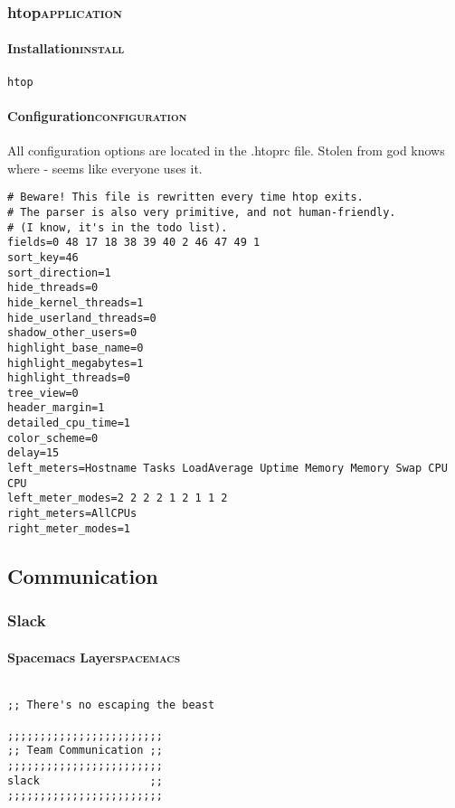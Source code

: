 \documentclass[11pt]{article}
\begin{document}
\subsubsection{htop\hfill{}\textsc{application}}
\label{sec:org262f1df}
\paragraph{Installation\hfill{}\textsc{install}}
\label{sec:orgaa9491f}
\begin{verbatim}
htop
\end{verbatim}

\paragraph{Configuration\hfill{}\textsc{configuration}}
\label{sec:orgb64764a}
All configuration options are located in the .htoprc file.
Stolen from god knows where - seems like everyone uses it.

\begin{verbatim}
# Beware! This file is rewritten every time htop exits.
# The parser is also very primitive, and not human-friendly.
# (I know, it's in the todo list).
fields=0 48 17 18 38 39 40 2 46 47 49 1
sort_key=46
sort_direction=1
hide_threads=0
hide_kernel_threads=1
hide_userland_threads=0
shadow_other_users=0
highlight_base_name=0
highlight_megabytes=1
highlight_threads=0
tree_view=0
header_margin=1
detailed_cpu_time=1
color_scheme=0
delay=15
left_meters=Hostname Tasks LoadAverage Uptime Memory Memory Swap CPU CPU
left_meter_modes=2 2 2 2 1 2 1 1 2
right_meters=AllCPUs
right_meter_modes=1
\end{verbatim}

\subsection{Communication}
\label{sec:org7209009}
\subsubsection{Slack}
\label{sec:org15a22e9}

\paragraph{Spacemacs Layer\hfill{}\textsc{spacemacs}}
\label{sec:org079c3a3}
\begin{verbatim}

;; There's no escaping the beast

;;;;;;;;;;;;;;;;;;;;;;;;
;; Team Communication ;;
;;;;;;;;;;;;;;;;;;;;;;;;
slack                 ;;
;;;;;;;;;;;;;;;;;;;;;;;;
\end{verbatim}
\end{document}
